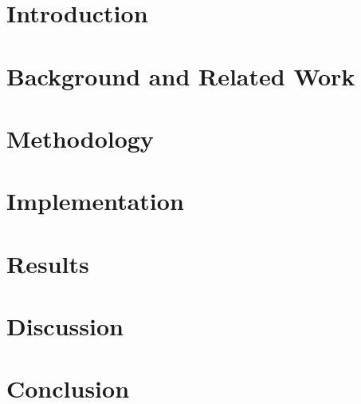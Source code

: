 



\newpage

\newpage


\clearpage

\tableofcontents
\listoffigures
\listoftables
\lstlistoflistings

\newpage

\chapter{Introduction}


\chapter{Background and Related Work}


\chapter{Methodology}


\chapter{Implementation}


\chapter{Results}


\chapter{Discussion}


\chapter{Conclusion}






